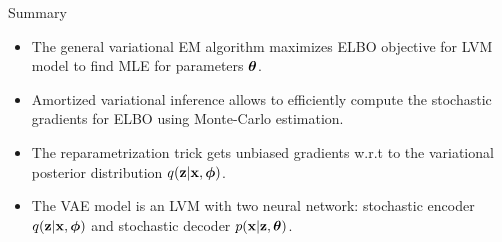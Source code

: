 	\begin{frame}{Summary}
		\begin{itemize}
			\item The general variational EM algorithm maximizes ELBO objective for LVM model to find MLE for parameters $\boldsymbol{\theta}$.
			\vfill
			\item Amortized variational inference allows to efficiently compute the stochastic gradients for ELBO using Monte-Carlo estimation.
			\vfill
			\item The reparametrization trick gets unbiased gradients w.r.t to the variational posterior distribution $q(\mathbf{z} | \mathbf{x}, \boldsymbol{\phi})$.
			\vfill
			\item The VAE model is an LVM with two neural network: stochastic encoder $q(\mathbf{z} | \mathbf{x}, \boldsymbol{\phi})$ and stochastic decoder $p(\mathbf{x} | \mathbf{z}, \boldsymbol{\theta})$.
		\end{itemize}
	\end{frame}
 